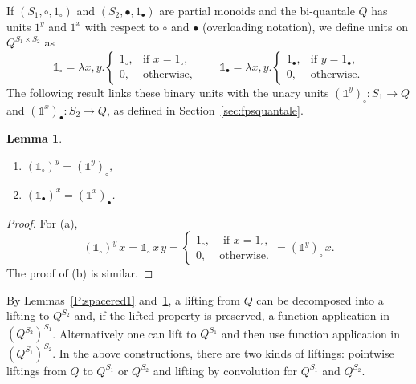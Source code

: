 \documentclass[12pt]{article}
\newtheorem{lemma}{Lemma}
\theoremstyle{definition}
\newcommand{\unit}{\mathbb{1}}
\begin{document}
If $(S_1,\circ,1_\circ)$ and $(S_2,\bullet,1_\bullet)$ are partial
monoids and the bi-quantale $Q$ has units $1^y$ and $1^x$ with respect
to $\circ$ and $\bullet$ (overloading notation), we define units on
$Q^{S_1\times S_2}$ as
\begin{equation*}
  \unit_\circ = \lambda x,y.
  \begin{cases}
    1_\circ, & \text{if } x = 1_\circ,\\
    0, & \text{otherwise},
  \end{cases}
\qquad
 \unit_\bullet = \lambda x,y.
  \begin{cases}
    1_\bullet, & \text{if } y = 1_\bullet,\\
    0, & \text{otherwise}.
  \end{cases}
\end{equation*}
The following result links these binary units with the unary units
$(\unit^y)_\circ:S_1\to Q$ and $(\unit^x)_\bullet:S_2\to Q$, as
defined in Section~\ref{sec:fpsquantale}.
\begin{lemma}\label{P:spacered2}~ 
  \begin{enumerate}
  \item $(\unit_\circ)^y = (\unit^y)_\circ$,
  \item  $(\unit_\bullet)^x= (\unit^x)_\bullet$.
  \end{enumerate}
\end{lemma}
\begin{proof}
  For (a),
  \begin{equation*}
    (\unit_\circ)^y\, x = \unit_\circ\, x\, y =  
    \begin{cases}
      1_\circ, & \text{ if } x=1_\circ,\\
      0, & \text{otherwise}.
    \end{cases}
    =(\unit^y)_\circ\, x.
  \end{equation*}
 The proof of (b) is similar.
\end{proof}

By Lemmas~\ref{P:spacered1} and~\ref{P:spacered2}, a lifting from $Q$
can be decomposed into a lifting to $Q^{S_2}$ and, if the lifted
property is preserved, a function application in
$(Q^{S_2})^{S_1}$. Alternatively one can lift to $Q^{S_1}$ and then
use function application in $(Q^{S_1})^{S_2}$. In the above
constructions, there are two kinds of liftings: pointwise liftings
from $Q$ to $Q^{S_1}$ or $Q^{S_2}$ and lifting by convolution for
$Q^{S_1}$ and $Q^{S_2}$.
\end{document}
